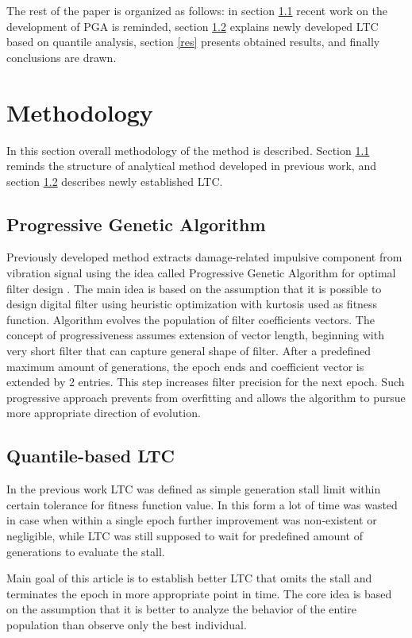 \documentclass{svproc}
\begin{document}
The rest of the paper is organized as follows: in section \ref{pga} recent work on the development of PGA is reminded, section \ref{crit} explains newly developed LTC based on quantile analysis, section \ref{res} presents obtained results, and finally conclusions are drawn. 


\section{Methodology}

In this section overall methodology of the method is described. Section \ref{pga} reminds the structure of analytical method developed in previous work, and section \ref{crit} describes newly established LTC. 

\subsection{Progressive Genetic Algorithm}\label{pga}

Previously developed method extracts damage-related impulsive component from vibration signal using the idea called Progressive Genetic Algorithm for optimal filter design \cite{wodecki2018optimal}. The main idea is based on the assumption that it is possible to design digital filter using heuristic optimization with kurtosis used as fitness function. Algorithm evolves the population of filter coefficients vectors. The concept of progressiveness assumes extension of vector length, beginning with very short filter that can capture general shape of filter. After a predefined maximum amount of generations, the epoch ends and coefficient vector is extended by 2 entries. This step increases filter precision for the next epoch. Such progressive approach prevents from overfitting and allows the algorithm to pursue more appropriate direction of evolution. 

\subsection{Quantile-based LTC}\label{crit}

In the previous work LTC was defined as simple generation stall limit within certain tolerance for fitness function value. In this form a lot of time was wasted in case when within a single epoch further improvement was non-existent or negligible, while LTC was still supposed to wait for predefined amount of generations to evaluate the stall. 

Main goal of this article is to establish better LTC that omits the stall and terminates the epoch in more appropriate point in time. The core idea is based on the assumption that it is better to analyze the behavior of the entire population than observe only the best individual.
\end{document}
